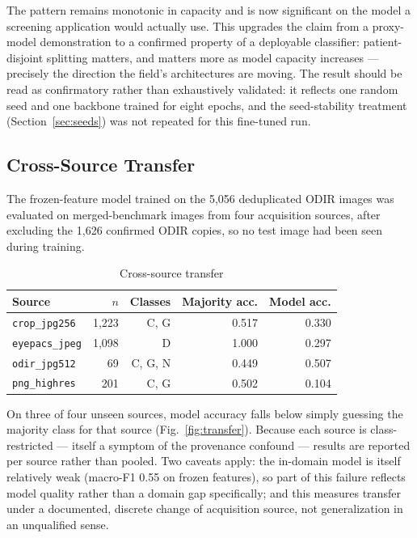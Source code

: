\documentclass[conference]{IEEEtran}
\begin{document}
The pattern remains monotonic in capacity and is now significant on the
model a screening application would actually use. This upgrades the claim
from a proxy-model demonstration to a confirmed property of a deployable
classifier: patient-disjoint splitting matters, and matters more as model
capacity increases --- precisely the direction the field's architectures
are moving. The result should be read as confirmatory rather than
exhaustively validated: it reflects one random seed and one backbone
trained for eight epochs, and the seed-stability treatment
(Section~\ref{sec:seeds}) was not repeated for this fine-tuned run.

\subsection{Cross-Source Transfer}
\label{sec:transfer}

The frozen-feature model trained on the 5{,}056 deduplicated ODIR images
was evaluated on merged-benchmark images from four acquisition sources,
after excluding the 1{,}626 confirmed ODIR copies, so no test image had
been seen during training.

\begin{table}[!t]
\caption{Cross-source transfer}
\label{tab:transfer}
\centering
\begin{tabular}{@{}lrrrr@{}}
\toprule
Source & $n$ & Classes & Majority acc. & Model acc. \\
\midrule
\texttt{crop\_jpg256} & 1{,}223 & C, G & 0.517 & 0.330 \\
\texttt{eyepacs\_jpeg} & 1{,}098 & D & 1.000 & 0.297 \\
\texttt{odir\_jpg512} & 69 & C, G, N & 0.449 & 0.507 \\
\texttt{png\_highres} & 201 & C, G & 0.502 & 0.104 \\
\bottomrule
\end{tabular}
\end{table}

On three of four unseen sources, model accuracy falls below simply guessing
the majority class for that source (Fig.~\ref{fig:transfer}). Because each
source is class-restricted --- itself a symptom of the provenance confound
--- results are reported per source rather than pooled. Two caveats apply:
the in-domain model is itself relatively weak (macro-F1 0.55 on frozen
features), so part of this failure reflects model quality rather than a
domain gap specifically; and this measures transfer under a documented,
discrete change of acquisition source, not generalization in an unqualified
sense.
\end{document}
